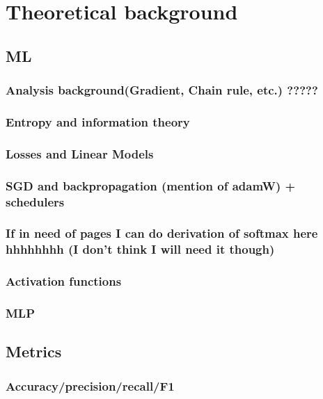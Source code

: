 \chapter{Theoretical background}

\section{ML}
\subsection{Analysis background(Gradient, Chain rule, etc.) ?????}
\subsection{Entropy and information theory}
\subsection{Losses and Linear Models}
\subsection{SGD and backpropagation (mention of adamW) + schedulers}
\subsection{If in need of pages I can do derivation of softmax here hhhhhhhh (I don't think I will need it though)}
\subsection{Activation functions}
\subsection{MLP}


\section{Metrics}
\subsection{Accuracy/precision/recall/F1}

